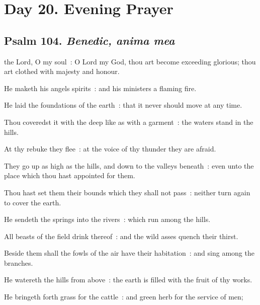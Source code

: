 \section*{Day 20. Evening Prayer}

\subsection{Psalm 104. \textit{Benedic, anima mea}}


 the Lord, O my soul~: O Lord my God, thou art become exceeding glorious; thou art clothed with majesty and honour.\par
{}
He maketh his angels spirits~: and his ministers a flaming fire.\par
{}He laid the foundations of the earth~: that it never should move at any time.\par
{}Thou coveredst it with the deep like as with a garment~: the waters stand in the hills.\par
{}At thy rebuke they flee~: at the voice of thy thunder they are afraid.\par
{}They go up as high as the hills, and down to the valleys beneath~: even unto the place which thou hast appointed for them.\par
{}Thou hast set them their bounds which they shall not pass~: neither turn again to cover the earth.\par
{}He sendeth the springs into the rivers~: which run among the hills.\par
{}All beasts of the field drink thereof~: and the wild asses quench their thirst.\par
{}Beside them shall the fowls of the air have their habitation~: and sing among the branches.\par
{}He watereth the hills from above~: the earth is filled with the fruit of thy works.\par
{}He bringeth forth grass for the cattle~: and green herb for the service of men;\par
